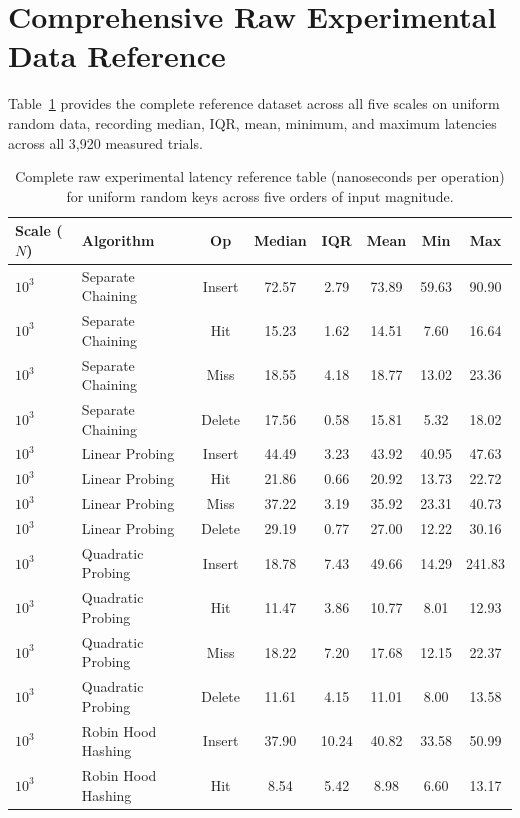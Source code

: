 \documentclass[conference]{IEEEtran}
\begin{document}
\section{Comprehensive Raw Experimental Data Reference}

Table~\ref{tbl:raw_reference} provides the complete reference dataset across all five scales on uniform random data, recording median, IQR, mean, minimum, and maximum latencies across all 3,920 measured trials.

\begin{table}[t]
\centering
\caption{Complete raw experimental latency reference table (nanoseconds per operation) for uniform random keys across five orders of input magnitude.}
\label{tbl:raw_reference}
\begin{tabular}{llcccccc}
\toprule
\textbf{Scale ($N$)} & \textbf{Algorithm} & \textbf{Op} & \textbf{Median} & \textbf{IQR} & \textbf{Mean} & \textbf{Min} & \textbf{Max} \\
\midrule
$10^3$ & Separate Chaining & Insert & 72.57 & 2.79 & 73.89 & 59.63 & 90.90 \\
$10^3$ & Separate Chaining & Hit & 15.23 & 1.62 & 14.51 & 7.60 & 16.64 \\
$10^3$ & Separate Chaining & Miss & 18.55 & 4.18 & 18.77 & 13.02 & 23.36 \\
$10^3$ & Separate Chaining & Delete & 17.56 & 0.58 & 15.81 & 5.32 & 18.02 \\
$10^3$ & Linear Probing & Insert & 44.49 & 3.23 & 43.92 & 40.95 & 47.63 \\
$10^3$ & Linear Probing & Hit & 21.86 & 0.66 & 20.92 & 13.73 & 22.72 \\
$10^3$ & Linear Probing & Miss & 37.22 & 3.19 & 35.92 & 23.31 & 40.73 \\
$10^3$ & Linear Probing & Delete & 29.19 & 0.77 & 27.00 & 12.22 & 30.16 \\
$10^3$ & Quadratic Probing & Insert & 18.78 & 7.43 & 49.66 & 14.29 & 241.83 \\
$10^3$ & Quadratic Probing & Hit & 11.47 & 3.86 & 10.77 & 8.01 & 12.93 \\
$10^3$ & Quadratic Probing & Miss & 18.22 & 7.20 & 17.68 & 12.15 & 22.37 \\
$10^3$ & Quadratic Probing & Delete & 11.61 & 4.15 & 11.01 & 8.00 & 13.58 \\
$10^3$ & Robin Hood Hashing & Insert & 37.90 & 10.24 & 40.82 & 33.58 & 50.99 \\
$10^3$ & Robin Hood Hashing & Hit & 8.54 & 5.42 & 8.98 & 6.60 & 13.17 \\

\end{tabular}
\end{table}
\end{document}
